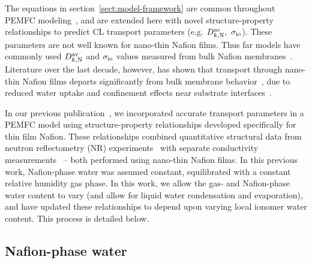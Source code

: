 \documentclass[final,3p,times,twocolumn]{elsarticle}    %
\begin{document}
The equations in section~\ref{sect:model-framework} are common throughout PEMFC modeling~\cite{bib:weber_2004, bib:weber_2014, bib:arif_2020}, and are extended here with novel structure-property relationships to predict CL transport parameters (e.g. $D_{k,\rm N}^{\rm av}, \ \sigma_{\rm io}$). These parameters are not well known for nano-thin Nafion films. Thus far models have commonly used $D_{k,\rm N}^{\rm av}$ and $\sigma_{\rm io}$ values measured from bulk Nafion membranes~\cite{bib:springer_1991, bib:weber_2004, bib:chu_2003, bib:ismail_2017, bib:aghighi_2017}. Literature over the last decade, however, has shown that transport through nano-thin Nafion films departs significantly from bulk membrane behavior~\cite{bib:decaluwe_2018, bib:paul_mccreery_2014, bib:paul_2014}, due to reduced water uptake and confinement effects near substrate interfaces~\cite{bib:dura_2009, bib:decaluwe_2018, bib:kusoglu_2012, bib:kusoglu_2017}.

In our previous publication~\cite{bib:randall_2020}, we incorporated accurate transport parameters in a PEMFC model using structure-property relationships developed specifically for thin film Nafion. These relationships combined quantitative structural data from neutron reflectometry (NR) experiments~\cite{bib:decaluwe_2018} with separate conductivity measurements~\cite{bib:paul_mccreery_2014} -- both performed using nano-thin Nafion films. In this previous work, Nafion-phase water was assumed constant, equilibrated with a constant relative humidity gas phase. In this work, we allow the gas- and Nafion-phase water content to vary (and allow for liquid water condensation and evaporation), and have updated these relationships to depend upon varying local ionomer water content. This process is detailed below.

\subsection{Nafion-phase water}
\end{document}
